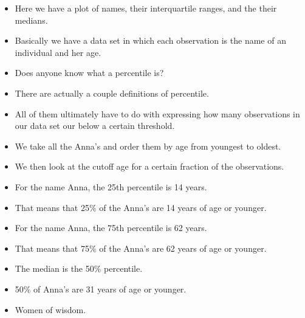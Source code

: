 \documentclass[slidestop,compress,mathserif,12pt,t,professionalfonts,xcolor=table]{beamer}
\begin{document}
\begin{frame}
{  \begin{itemize}
  \item Here we have a plot of names, their interquartile ranges, and the their medians.
  \item Basically we have a data set in which each observation is the name of an individual and her age.
  \item Does anyone know what a percentile is?
  \item There are actually a couple definitions of percentile.
  \item All of them ultimately have to do with expressing how many observations in our data set our below a certain threshold.
  \item We take all the Anna's and order them by age from youngest to oldest.
  \item We then look at the cutoff age for a certain fraction of the observations.
  \item For the name Anna, the 25th percentile is 14 years.
  \item That means that 25\% of the Anna's are 14 years of age or younger.
  \item For the name Anna, the 75th percentile is 62 years.
  \item That means that 75\% of the Anna's are 62 years of age or younger.
  \item The median is the 50\% percentile.
  \item 50\% of Anna's are 31 years of age or younger.
  \item Women of wisdom.
  \end{itemize}

}

\end{frame}

\end{document}
